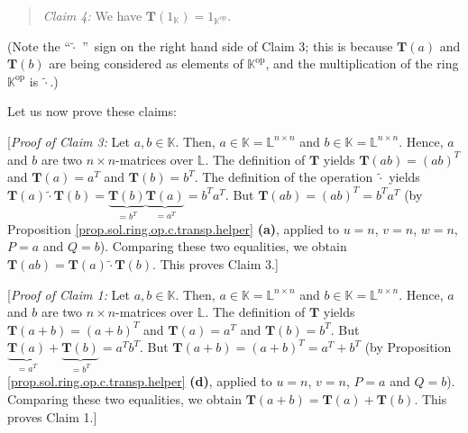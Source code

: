 \documentclass[paper=a4, fontsize=12pt]{scrartcl}%
\theoremstyle{plainsl}
\theoremstyle{definition}
\theoremstyle{remark}
\newenvironment{statement}{\begin{quote}}{\end{quote}}
\begin{document}
\begin{statement}
\textit{Claim 4:} We have $\mathbf{T}\left(  1_{\mathbb{K}}\right)
=1_{\mathbb{K}^{\operatorname*{op}}}$.
\end{statement}

(Note the \textquotedblleft$\left.  \widetilde{\cdot}\right.  $%
\textquotedblright\ sign on the right hand side of Claim 3; this is because
$\mathbf{T}\left(  a\right)  $ and $\mathbf{T}\left(  b\right)  $ are being
considered as elements of $\mathbb{K}^{\operatorname*{op}}$, and the
multiplication of the ring $\mathbb{K}^{\operatorname*{op}}$ is $\left.
\widetilde{\cdot}\right.  $.)

Let us now prove these claims:

[\textit{Proof of Claim 3:} Let $a,b\in\mathbb{K}$. Then, $a\in\mathbb{K}%
=\mathbb{L}^{n\times n}$ and $b\in\mathbb{K}=\mathbb{L}^{n\times n}$. Hence,
$a$ and $b$ are two $n\times n$-matrices over $\mathbb{L}$. The definition of
$\mathbf{T}$ yields $\mathbf{T}\left(  ab\right)  =\left(  ab\right)  ^{T}$
and $\mathbf{T}\left(  a\right)  =a^{T}$ and $\mathbf{T}\left(  b\right)
=b^{T}$. The definition of the operation $\left.  \widetilde{\cdot}\right.  $
yields $\mathbf{T}\left(  a\right)  \left.  \widetilde{\cdot}\right.
\mathbf{T}\left(  b\right)  =\underbrace{\mathbf{T}\left(  b\right)  }%
_{=b^{T}}\underbrace{\mathbf{T}\left(  a\right)  }_{=a^{T}}=b^{T}a^{T}$. But
$\mathbf{T}\left(  ab\right)  =\left(  ab\right)  ^{T}=b^{T}a^{T}$ (by
Proposition \ref{prop.sol.ring.op.c.transp.helper} \textbf{(a)}, applied to
$u=n$, $v=n$, $w=n$, $P=a$ and $Q=b$). Comparing these two equalities, we
obtain $\mathbf{T}\left(  ab\right)  =\mathbf{T}\left(  a\right)  \left.
\widetilde{\cdot}\right.  \mathbf{T}\left(  b\right)  $. This proves Claim 3.]

[\textit{Proof of Claim 1:} Let $a,b\in\mathbb{K}$. Then, $a\in\mathbb{K}%
=\mathbb{L}^{n\times n}$ and $b\in\mathbb{K}=\mathbb{L}^{n\times n}$. Hence,
$a$ and $b$ are two $n\times n$-matrices over $\mathbb{L}$. The definition of
$\mathbf{T}$ yields $\mathbf{T}\left(  a+b\right)  =\left(  a+b\right)  ^{T}$
and $\mathbf{T}\left(  a\right)  =a^{T}$ and $\mathbf{T}\left(  b\right)
=b^{T}$. But $\underbrace{\mathbf{T}\left(  a\right)  }_{=a^{T}}%
+\underbrace{\mathbf{T}\left(  b\right)  }_{=b^{T}}=a^{T}b^{T}$. But
$\mathbf{T}\left(  a+b\right)  =\left(  a+b\right)  ^{T}=a^{T}+b^{T}$ (by
Proposition \ref{prop.sol.ring.op.c.transp.helper} \textbf{(d)}, applied to
$u=n$, $v=n$, $P=a$ and $Q=b$). Comparing these two equalities, we obtain
$\mathbf{T}\left(  a+b\right)  =\mathbf{T}\left(  a\right)  +\mathbf{T}\left(
b\right)  $. This proves Claim 1.]
\end{document}
